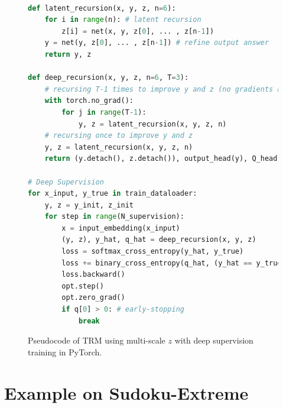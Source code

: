 \documentclass{article}
\theoremstyle{plain}
\theoremstyle{definition}
\theoremstyle{remark}
\begin{document}
\begin{figure}[H]
  \centering
    \begin{lstlisting}[language=python]

def latent_recursion(x, y, z, n=6):
    for i in range(n): # latent recursion
        z[i] = net(x, y, z[0], ... , z[n-1])
    y = net(y, z[0], ... , z[n-1]) # refine output answer
    return y, z
    
def deep_recursion(x, y, z, n=6, T=3):
    # recursing T-1 times to improve y and z (no gradients needed)
    with torch.no_grad():
        for j in range(T-1):
            y, z = latent_recursion(x, y, z, n)
    # recursing once to improve y and z
    y, z = latent_recursion(x, y, z, n)
    return (y.detach(), z.detach()), output_head(y), Q_head(y)

# Deep Supervision
for x_input, y_true in train_dataloader:
    y, z = y_init, z_init
    for step in range(N_supervision):
        x = input_embedding(x_input)
        (y, z), y_hat, q_hat = deep_recursion(x, y, z)
        loss = softmax_cross_entropy(y_hat, y_true)
        loss += binary_cross_entropy(q_hat, (y_hat == y_true))
        loss.backward()
        opt.step()
        opt.zero_grad()
        if q[0] > 0: # early-stopping
            break
    \end{lstlisting}
  \caption{Pseudocode of TRM using multi-scale $z$ with deep supervision training in PyTorch.}
  \label{fig:pseudocode_multi}
\end{figure}

\newpage
\section*{Example on Sudoku-Extreme}
\end{document}
